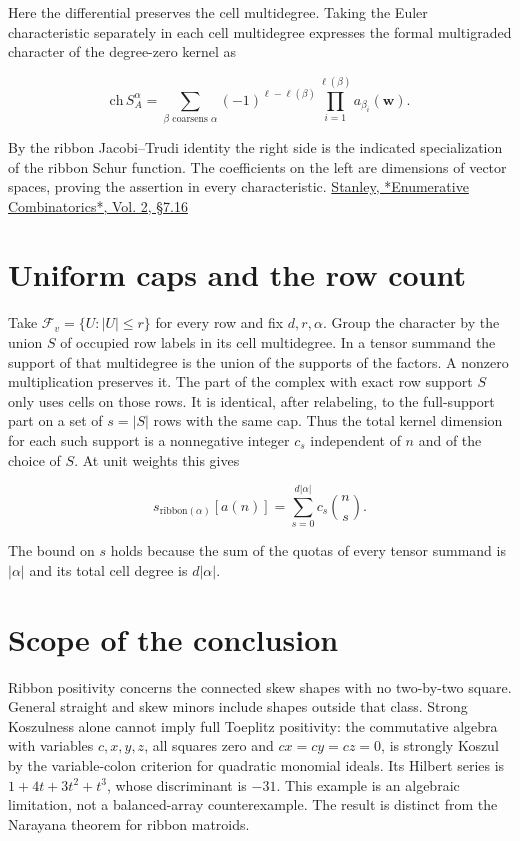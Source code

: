 \documentclass[11pt]{article}
\begin{document}
Here the differential preserves the cell multidegree. Taking the Euler characteristic separately in each cell multidegree expresses the formal multigraded character of the degree-zero kernel as

\begin{equation*}
\mathrm{ch}\, S_A^\alpha
=\sum_{\beta\text{ coarsens }\alpha}(-1)^{\ell-\ell(\beta)}
   \prod_{i=1}^{\ell(\beta)} a_{\beta_i}(\mathbf w).
\end{equation*}

By the ribbon Jacobi--Trudi identity the right side is the indicated specialization of the ribbon Schur function. The coefficients on the left are dimensions of vector spaces, proving the assertion in every characteristic. \href{https://math.mit.edu/~rstan/ec/}{Stanley, *Enumerative Combinatorics*, Vol. 2, \S7.16}

\section{Uniform caps and the row count}

Take $\mathcal F_v=\{U:|U|\le r\}$ for every row and fix $d,r,\alpha$. Group the character by the union $S$ of occupied row labels in its cell multidegree. In a tensor summand the support of that multidegree is the union of the supports of the factors. A nonzero multiplication preserves it. The part of the complex with exact row support $S$ only uses cells on those rows. It is identical, after relabeling, to the full-support part on a set of $s=|S|$ rows with the same cap. Thus the total kernel dimension for each such support is a nonnegative integer $c_s$ independent of $n$ and of the choice of $S$. At unit weights this gives

\begin{equation*}
s_{\mathrm{ribbon}(\alpha)}[a(n)]=\sum_{s=0}^{d|\alpha|}c_s\binom ns .
\end{equation*}

The bound on $s$ holds because the sum of the quotas of every tensor summand is $|\alpha|$ and its total cell degree is $d|\alpha|$.

\section{Scope of the conclusion}

Ribbon positivity concerns the connected skew shapes with no two-by-two square. General straight and skew minors include shapes outside that class. Strong Koszulness alone cannot imply full Toeplitz positivity: the commutative algebra with variables $c,x,y,z$, all squares zero and $cx=cy=cz=0$, is strongly Koszul by the variable-colon criterion for quadratic monomial ideals. Its Hilbert series is $1+4t+3t^2+t^3$, whose discriminant is $-31$. This example is an algebraic limitation, not a balanced-array counterexample. The result is distinct from the Narayana theorem for ribbon matroids.
\end{document}
